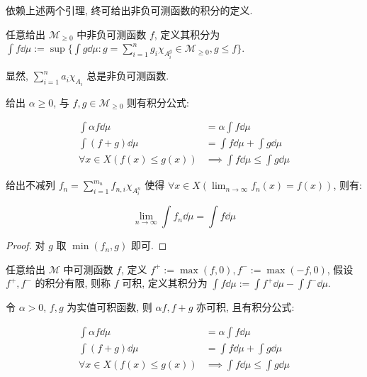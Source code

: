 依赖上述两个引理, 终可给出非负可测函数的积分的定义.

\begin{definition}[积分]
    \label {definition:integral on nonnegative measurable function}
    任意给出 \(\mathcal{M}_{\geq 0}\) 中非负可测函数 \(f\), 定义其积分为 \(\int f \dd \mu := \sup \{\int g \dd \mu : g = \sum_{i=1}^{n} g_i \chi_{A^g_i} \in \mathcal{M}_{\geq 0}, g \leq f\}\).
\end{definition}

\begin{remark}
    显然, \(\sum_{i=1}^{n} a_i \chi_{A_i}\) 总是非负可测函数.
\end{remark}

\begin{lemma}
    给出 \(\alpha \geq 0\), 与 \(f,g \in \mathcal{M}_{\geq 0}\) 则有积分公式:

    \[
        \begin{aligned}
            \int \alpha f \dd \mu &= \alpha \int f \dd \mu \\
            \int (f+g) \dd \mu &= \int f \dd \mu + \int g \dd \mu \\
            \forall x \in X (f(x) \leq g(x)) &\implies \int f \dd \mu \leq \int g \dd \mu
        \end{aligned}
    \]
\end{lemma}

\begin{lemma}
    给出不减列 \(f_n = \sum_{i=1}^{m_n} f_{n,i} \chi_{A_i^n}\) 使得 \(\forall x \in X (\lim_{n \to \infty} f_n(x) = f(x))\), 则有:

    \[
        \lim_{n \to \infty} \int f_n \dd \mu = \int f \dd \mu
    \]

    \begin{proof}
        对 \(g\) 取 \(\min (f_n,g)\) 即可.
    \end{proof}
\end{lemma}

\begin{definition}[积分]
    \label {definition:integral on measurable function}
    任意给出 \(\mathcal{M}\) 中可测函数 \(f\), 定义 \(f^{+} := \max (f,0), f^{-} := \max (-f,0)\), 假设 \(f^{+},f^{-}\) 的积分有限, 则称 \(f\) 可积,
    定义其积分为 \(\int f \dd \mu := \int f^{+} \dd \mu - \int f^{-} \dd \mu\).
\end{definition}

\begin{lemma}
    令 \(\alpha > 0\), \(f,g\) 为实值可积函数, 则 \(\alpha f, f+g\) 亦可积, 且有积分公式:

    \[
        \begin{aligned}
            \int \alpha f \dd \mu &= \alpha \int f \dd \mu \\
            \int (f+g) \dd \mu &= \int f \dd \mu + \int g \dd \mu \\
            \forall x \in X (f(x) \leq g(x)) &\implies \int f \dd \mu \leq \int g \dd \mu
        \end{aligned}
    \]
\end{lemma}

